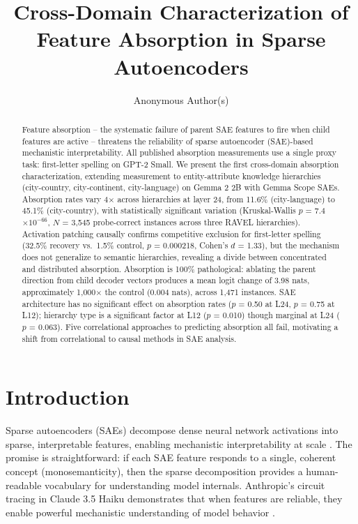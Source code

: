 \documentclass{article}
\title{Cross-Domain Characterization of Feature Absorption in Sparse Autoencoders}
\author{%
  Anonymous Author(s)
}
\begin{document}
\maketitle

\begin{abstract}
Feature absorption -- the systematic failure of parent SAE features to fire when child features are active -- threatens the reliability of sparse autoencoder (SAE)-based mechanistic interpretability. All published absorption measurements use a single proxy task: first-letter spelling on GPT-2 Small. We present the first cross-domain absorption characterization, extending measurement to entity-attribute knowledge hierarchies (city-country, city-continent, city-language) on Gemma 2 2B with Gemma Scope SAEs. Absorption rates vary 4$\times$ across hierarchies at layer 24, from 11.6\% (city-language) to 45.1\% (city-country), with statistically significant variation (Kruskal-Wallis $p$ = 7.4 $\times 10^{-66}$, $N$ = 3{,}545 probe-correct instances across three RAVEL hierarchies). Activation patching causally confirms competitive exclusion for first-letter spelling (32.5\% recovery vs.\ 1.5\% control, $p$ = 0.000218, Cohen's $d$ = 1.33), but the mechanism does not generalize to semantic hierarchies, revealing a divide between concentrated and distributed absorption. Absorption is 100\% pathological: ablating the parent direction from child decoder vectors produces a mean logit change of 3.98 nats, approximately 1{,}000$\times$ the control (0.004 nats), across 1{,}471 instances. SAE architecture has no significant effect on absorption rates ($p$ = 0.50 at L24, $p$ = 0.75 at L12); hierarchy type is a significant factor at L12 ($p$ = 0.010) though marginal at L24 ($p$ = 0.063). Five correlational approaches to predicting absorption all fail, motivating a shift from correlational to causal methods in SAE analysis.
\end{abstract}

\section{Introduction}
\label{sec:intro}

Sparse autoencoders (SAEs) decompose dense neural network activations into sparse, interpretable features, enabling mechanistic interpretability at scale \citep{cunningham2024sparse, bricken2023monosemanticity}. The promise is straightforward: if each SAE feature responds to a single, coherent concept (monosemanticity), then the sparse decomposition provides a human-readable vocabulary for understanding model internals. Anthropic's circuit tracing in Claude 3.5 Haiku demonstrates that when features are reliable, they enable powerful mechanistic understanding of model behavior \citep{lindsey2025circuit}.
\end{document}
